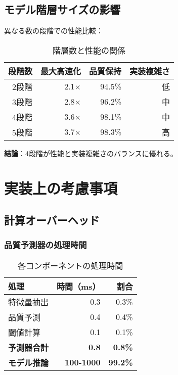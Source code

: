 \documentclass[a4paper,12pt]{jsarticle}
\begin{document}
\subsection{モデル階層サイズの影響}

異なる数の段階での性能比較：

\begin{table}[H]
\centering
\caption{階層数と性能の関係}
\begin{tabular}{|r|r|r|r|}
\hline
\textbf{段階数} & \textbf{最大高速化} & \textbf{品質保持} & \textbf{実装複雑さ} \\
\hline
2段階 & 2.1× & 94.5\% & 低 \\
3段階 & 2.8× & 96.2\% & 中 \\
4段階 & 3.6× & 98.1\% & 中 \\
5段階 & 3.7× & 98.3\% & 高 \\
\hline
\end{tabular}
\end{table}

\textbf{結論}：4段階が性能と実装複雑さのバランスに優れる。

\section{実装上の考慮事項}

\subsection{計算オーバーヘッド}

\subsubsection{品質予測器の処理時間}

\begin{table}[H]
\centering
\caption{各コンポーネントの処理時間}
\begin{tabular}{|l|r|r|}
\hline
\textbf{処理} & \textbf{時間（ms）} & \textbf{割合} \\
\hline
特徴量抽出 & 0.3 & 0.3\% \\
品質予測 & 0.4 & 0.4\% \\
閾値計算 & 0.1 & 0.1\% \\
\hline
\textbf{予測器合計} & \textbf{0.8} & \textbf{0.8\%} \\
\textbf{モデル推論} & \textbf{100-1000} & \textbf{99.2\%} \\
\hline
\end{tabular}
\end{table}
\end{document}
